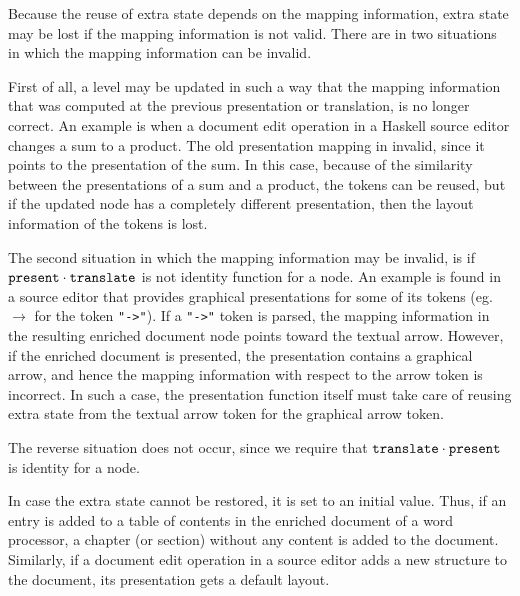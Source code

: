 Because the reuse of extra state depends on the mapping information, extra state may be lost if the mapping information is not valid. There are in two situations in which the mapping information can be invalid.  

First of all, a level may be updated in such a way that the mapping information that was computed at the previous presentation or translation, is no longer correct. An example is when a document edit operation in a Haskell source editor changes a sum to a product. The old presentation mapping in invalid, since it points to the presentation of the sum. In this case, because of the similarity between the presentations of a sum and a product, the tokens can be reused, but if the updated node has a completely different presentation, then the layout information of the tokens is lost.

The second situation in which the mapping information may be invalid, is if 
${\tt present} \cdot {\tt translate}$ is not identity function for a node.  An example is found in a source editor that provides graphical presentations for some of its tokens (eg. $\rightarrow$ for the token \verb|"->"|). If a \verb|"->"| token is parsed, the mapping information in the resulting enriched document node points toward the textual arrow. However, if the enriched document is presented, the presentation contains a graphical arrow, and hence the mapping information with respect to the arrow token is incorrect. In such a case, the presentation function itself must take care of reusing extra state from the textual arrow token for the graphical arrow token.

The reverse situation does not occur, since we require that ${\tt translate} \cdot {\tt present}$ is identity for a node. 

In case the extra state cannot be restored, it is set to an initial value. Thus, if an entry is added to a table of contents in the enriched document of a word processor, a chapter (or section) without any content is added to the document. Similarly, if a document edit operation in a source editor adds a new structure to the document, its presentation gets a default layout.


